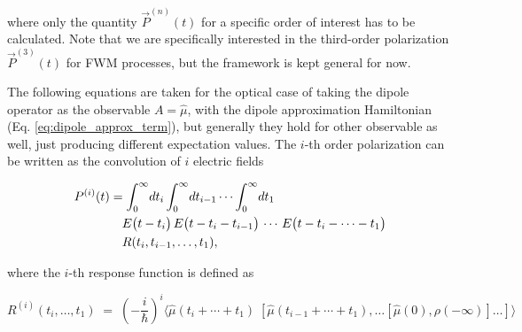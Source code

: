 \noindent
where only the quantity $\vec{P}^{(n)}(t)$ for a specific order of interest has to be calculated. Note that we are specifically interested in the third-order polarization $\vec{P}^{(3)}(t)$ for FWM processes, but the framework is kept general for now.

\noindent
The following equations are taken for the optical case of taking the dipole operator as the observable $A = \hat{\mu}$, with the dipole approximation Hamiltonian (Eq. \eqref{eq:dipole_approx_term}), but generally they hold for other observable as well, just producing different expectation values. 
The $i$-th order polarization can be written as the convolution of $i$ electric fields \cite{hamm2005principlesnonlinearoptical}

\begin{align}
	P^{(i)}(t) &= \int_{0}^{\infty}\! dt_{i} \int_{0}^{\infty}\! dt_{i-1} \cdots \int_{0}^{\infty}\! dt_{1} \notag \\
	&\quad E\bigl(t-t_{i}\bigr)\, E\bigl(t-t_{i}-t_{i-1}\bigr)\,\cdots\, E\bigl(t-t_{i}-\cdots - t_{1}\bigr) \notag \\
	&\quad R(t_{i},t_{i-1},\ldots,t_{1}),
	\label{eq:response_convolution}
\end{align}

\noindent
where the $i$-th response function is defined as

\begin{equation}
	R^{(i)}(t_{i},\ldots,t_{1})
	\;=\;
	\left(-\frac{i}{\hbar}\right)^{i}
	\Big\langle
	\hat{\mu}(t_{i}+\cdots + t_{1})\;[\hat{\mu}(t_{i-1}+\cdots + t_{1}),\ldots [\hat{\mu}(0),\rho(-\infty)]\ldots]
	\Big\rangle
	\label{eq:response_function_R}
\end{equation}

